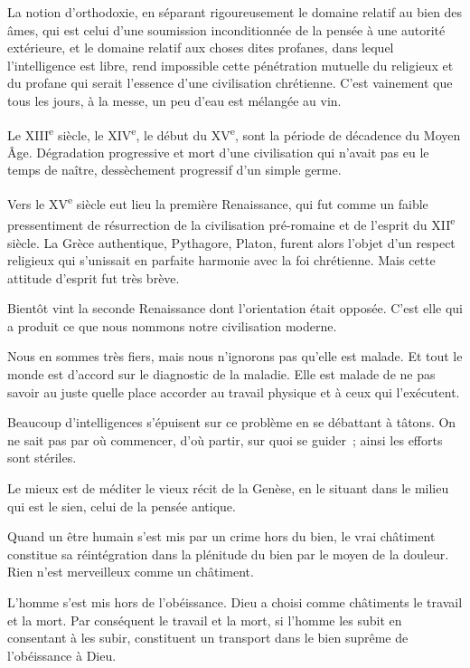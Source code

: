 \documentclass[french,twoside]{book} %
\begin{document}
La notion d'orthodoxie, en séparant rigoureusement le domaine relatif au bien des âmes, qui est celui d'une soumission inconditionnée de la pensée à une autorité extérieure, et le domaine relatif aux choses dites profanes, dans lequel l'intelligence est libre, rend impossible cette pénétration mutuelle du religieux et du profane qui serait l'essence d'une civilisation chrétienne. C'est vainement que tous les jours, à la messe, un peu d'eau est mélangée au vin.\par
Le XIII\textsuperscript{e} siècle, le XIV\textsuperscript{e}, le début du XV\textsuperscript{e}, sont la période de décadence du Moyen Âge. Dégradation progressive et mort d'une civilisation qui n'avait pas eu le temps de naître, dessèchement progressif d'un simple germe.\par
Vers le XV\textsuperscript{e} siècle eut lieu la première Renaissance, qui fut comme un faible pressentiment de résurrection de la civilisation pré-romaine et de l'esprit du XII\textsuperscript{e} siècle. La Grèce authentique, Pythagore, Platon, furent alors l'objet d'un respect religieux qui s'unissait en parfaite harmonie avec la foi chrétienne. Mais cette attitude d'esprit fut très brève.\par
Bientôt vint la seconde Renaissance dont l'orientation était opposée. C'est elle qui a produit ce que nous nommons notre civilisation moderne.\par
Nous en sommes très fiers, mais nous n'ignorons pas qu'elle est malade. Et tout le monde est d'accord sur le diagnostic de la maladie. Elle est malade de ne pas savoir au juste quelle place accorder au travail physique et à ceux qui l'exécutent.\par
Beaucoup d'intelligences s'épuisent sur ce problème en se débattant à tâtons. On ne sait pas par où commencer, d'où partir, sur quoi se guider ; ainsi les efforts sont stériles.\par
Le mieux est de méditer le vieux récit de la Genèse, en le situant dans le milieu qui est le sien, celui de la pensée antique.\par
Quand un être humain s'est mis par un crime hors du bien, le vrai châtiment constitue sa réintégration dans la plénitude du bien par le moyen de la douleur. Rien n'est merveilleux comme un châtiment.\par
L'homme s'est mis hors de l'obéissance. Dieu a choisi comme châtiments le travail et la mort. Par conséquent le travail et la mort, si l'homme les subit en consentant à les subir, constituent un transport dans le bien suprême de l'obéissance à Dieu.\par
\end{document}
